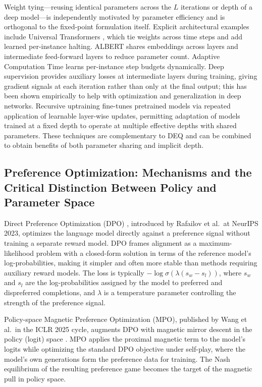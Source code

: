 Weight tying---reusing identical parameters across the $L$ iterations or depth of a deep model---is
independently motivated by parameter efficiency and is orthogonal to the fixed-point formulation itself.
Explicit architectural examples include Universal Transformers \citep{Dehghani2019}, which tie weights across
time steps and add learned per-instance halting.
ALBERT \citep{Lan2020} shares embeddings across layers and intermediate feed-forward layers to reduce parameter
count.
Adaptive Computation Time \citep{Graves2016} learns per-instance step budgets dynamically.
Deep supervision \citep{Lee2015} provides auxiliary losses at intermediate layers during training, giving
gradient signals at each iteration rather than only at the final output; this has been shown empirically to
help with optimization and generalization in deep networks.
Recursive uptraining \citep{RecursiveTransformers2024} fine-tunes pretrained models via repeated application
of learnable layer-wise updates, permitting adaptation of models trained at a fixed depth to operate at
multiple effective depths with shared parameters.
These techniques are complementary to DEQ and can be combined to obtain benefits of both parameter sharing and
implicit depth.

\subsection{Preference Optimization: Mechanisms and the Critical Distinction Between Policy and Parameter Space}

Direct Preference Optimization (DPO) \citep{Rafailov2023}, introduced by Rafailov et al.\ at NeurIPS 2023,
optimizes the language model directly against a preference signal without training a separate reward model.
DPO frames alignment as a maximum-likelihood problem with a closed-form solution in terms of the reference
model's log-probabilities, making it simpler and often more stable than methods requiring auxiliary reward
models.
The loss is typically $-\log \sigma(\lambda(s_w - s_l))$, where $s_w$ and $s_l$ are the log-probabilities
assigned by the model to preferred and dispreferred completions, and $\lambda$ is a temperature parameter
controlling the strength of the preference signal.

Policy-space Magnetic Preference Optimization (MPO), published by Wang et al.\ in the ICLR 2025 cycle,
augments DPO with magnetic mirror descent in the policy (logit) space \citep{Wang2025MPO}.
MPO applies the proximal magnetic term to the model's logits while optimizing the standard DPO objective
under self-play, where the model's own generations form the preference data for training.
The Nash equilibrium of the resulting preference game becomes the target of the magnetic pull in policy space.

